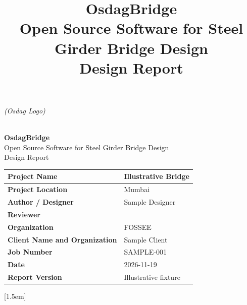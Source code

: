 \documentclass[12pt,a4paper]{report}
\title{\Large\textbf{OsdagBridge} \\ \normalsize Open Source Software for Steel Girder Bridge Design \\ \vspace{2cm} \large Design Report}
\author{}
\date{}
\numberwithin{table}{chapter}
\numberwithin{figure}{chapter}
\begin{document}
\begin{titlepage}
\thispagestyle{firstpage}
\centering
\vspace*{1.5cm}
\noindent
\begin{minipage}[c]{0.6\textwidth}
\raggedright
\textit{(Osdag Logo)}
\end{minipage}%
\hfill
\begin{minipage}[c]{0.35\textwidth}
\raggedleft

\end{minipage}
\\[1cm]

{\Huge \textbf{OsdagBridge}}\\[0.3cm]
{\large Open Source Software for Steel Girder Bridge Design}\\[1.5cm]
{\Large Design Report}\\[1.5cm]
\begin{tabular}{|L{4cm}|L{10cm}|}
\hline
\textbf{Project Name} & Illustrative Bridge \\
\hline
\textbf{Project Location} & Mumbai \\
\hline
\textbf{Author / Designer} & Sample Designer \\
\hline
\textbf{Reviewer} &  \\
\hline
\textbf{Organization} & FOSSEE \\
\hline
\textbf{Client Name and Organization} & Sample Client \\
\hline
\textbf{Job Number} & SAMPLE-001 \\
\hline
\textbf{Date} & 2026-11-19 \\
\hline
\textbf{Report Version} & Illustrative fixture \\
\hline
\end{tabular}
\end{titlepage}


\titleformat{\chapter}[block]
  {\normalfont\Large\bfseries\centering}{\thechapter}{1em}{}
\titlespacing*{\chapter}{0pt}{0pt}{10pt}
\setcounter{tocdepth}{2}

[1.5em]
  {\normalfont\vspace{2pt}}
  {\contentslabel{1.5em}}
  {\hspace*{-1.5em}}
  {\hfill\contentspage}
\end{document}
